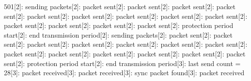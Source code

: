 \documentclass[parskip]{cs4rep}
\begin{document}
501[2]: sending packets[2]: packet sent[2]: packet sent[2]: packet sent[2]: packet sent[2]: packet sent[2]: packet sent[2]: packet sent[2]: packet sent[2]: packet sent[2]: packet sent[2]: packet sent[2]: packet sent[2]: packet sent[2]: protection period start[2]: end transmission period[2]: sending packets[2]: packet sent[2]: packet sent[2]: packet sent[2]: packet sent[2]: packet sent[2]: packet sent[2]: packet sent[2]: packet sent[2]: packet sent[2]: packet sent[2]: packet sent[2]: packet sent[2]: packet sent[2]: protection period start[2]: end transmission period[3]: last send count = 28[3]: packet received[3]: packet received[3]: sync packet found[3]: packet received\newline
\end{document}
